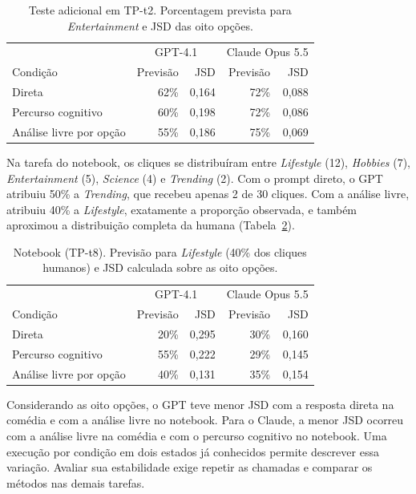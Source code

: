 \documentclass[12pt]{article}
\begin{document}
\begin{table}[!htb]\centering\small\caption{Teste adicional em TP-t2. Porcentagem prevista para \emph{Entertainment} e JSD das oito opções.}\label{tab:comedia}
\begin{tabular}{lrrrr}\toprule
 & \multicolumn{2}{c}{GPT-4.1} & \multicolumn{2}{c}{Claude Opus 5.5} \\
Condição & Previsão & JSD & Previsão & JSD \\ \midrule
Direta & 62\% & 0,164 & 72\% & 0,088 \\
Percurso cognitivo & 60\% & 0,198 & 72\% & 0,086 \\
Análise livre por opção & 55\% & 0,186 & 75\% & 0,069 \\
\bottomrule\end{tabular}\end{table}

Na tarefa do notebook, os cliques se distribuíram entre \emph{Lifestyle} (12), \emph{Hobbies} (7), \emph{Entertainment} (5), \emph{Science} (4) e \emph{Trending} (2). Com o prompt direto, o GPT atribuiu 50\% a \emph{Trending}, que recebeu apenas 2 de 30 cliques. Com a análise livre, atribuiu 40\% a \emph{Lifestyle}, exatamente a proporção observada, e também aproximou a distribuição completa da humana (Tabela~\ref{tab:notebook}).

\begin{table}[!htb]\centering\small\caption{Notebook (TP-t8). Previsão para \emph{Lifestyle} (40\% dos cliques humanos) e JSD calculada sobre as oito opções.}\label{tab:notebook}
\begin{tabular}{lrrrr}\toprule
 & \multicolumn{2}{c}{GPT-4.1} & \multicolumn{2}{c}{Claude Opus 5.5} \\
Condição & Previsão & JSD & Previsão & JSD \\ \midrule
Direta & 20\% & 0,295 & 30\% & 0,160 \\
Percurso cognitivo & 55\% & 0,222 & 29\% & 0,145 \\
Análise livre por opção & 40\% & 0,131 & 35\% & 0,154 \\
\bottomrule\end{tabular}\end{table}

Considerando as oito opções, o GPT teve menor JSD com a resposta direta na comédia e com a análise livre no notebook. Para o Claude, a menor JSD ocorreu com a análise livre na comédia e com o percurso cognitivo no notebook. Uma execução por condição em dois estados já conhecidos permite descrever essa variação. Avaliar sua estabilidade exige repetir as chamadas e comparar os métodos nas demais tarefas.
\end{document}
